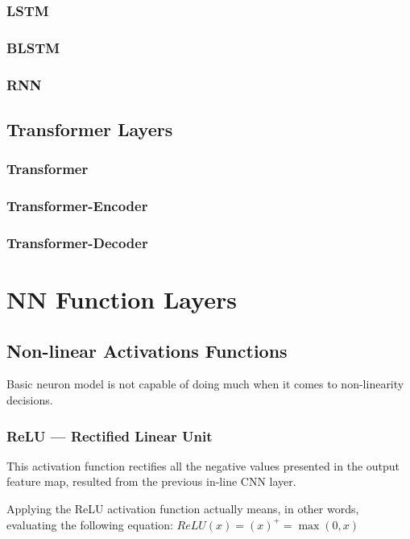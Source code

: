 \subsubsection{LSTM}
\subsubsection{BLSTM}
\subsubsection{RNN}

\subsection{Transformer Layers}
\subsubsection{Transformer}
\subsubsection{Transformer-Encoder}
\subsubsection{Transformer-Decoder}


\section{NN Function Layers}
\subsection{Non-linear Activations Functions}
Basic neuron model is not capable of doing much
when it comes to non-linearity decisions.



\subsubsection{ReLU --- Rectified Linear Unit}
This activation function rectifies all the negative
values presented in the output feature map, resulted
from the previous in-line CNN layer.

Applying the ReLU activation function
actually means, in other words, evaluating the following equation: \(ReLU(x) = {\left(x\right)}^{+} = \max(0, x)\)

